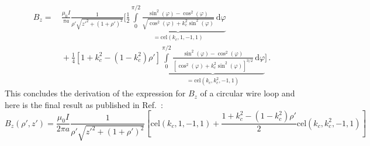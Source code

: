 \begin{align}
  B_z
 =&\, \frac{\mu_0 I}{\pi a}
      \frac{1}{\rho' \sqrt{z'^2 + (1 + \rho')^2}} \Biggl[
        \frac{1}{2} \underbrace{\int\limits_0^{\pi/2} \frac{\sin^2(\varphi) - \cos^2(\varphi)}
                                                           {\sqrt{\cos^2(\varphi) + k_c^2 \sin^2(\varphi)}} \,\mathrm{d}\varphi}_{=\textrm{cel}(k_c, 1, -1, 1)} \nonumber \\
 ~&\, + \frac{1}{4} \left[ 1 + k_c^2 - \left( 1 - k_c^2 \right) \rho' \right]
          \underbrace{\int\limits_0^{\pi/2} \frac{\sin^2(\varphi) - \cos^2(\varphi)}
                                                 {\left[\cos^2(\varphi) + k_c^2 \sin^2(\varphi) \right]^{3/2}} \,\mathrm{d}\varphi}_{=\textrm{cel}(k_c, k_c^2, -1, 1)} \Biggr] \, .
\end{align}
This concludes the derivation of the expression for $B_z$ of a circular wire loop
and here is the final result as published in Ref.~\cite{teal}:
\begin{equation}
\boxed{
 B_z(\rho', z')
 = \frac{\mu_0 I}{2 \pi a}
   \frac{1}{\rho' \sqrt{z'^2 + (1 + \rho')^2}}
   \left[
       \textrm{cel}(k_c, 1, -1, 1)
     + \frac{1 + k_c^2 - \left( 1 - k_c^2 \right) \rho'}{2} \textrm{cel}(k_c, k_c^2, -1, 1)
   \right]
}
\end{equation}
